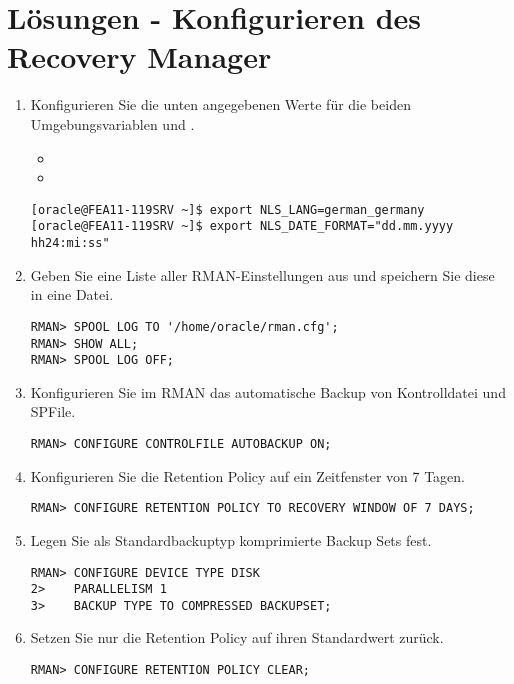 \section{L\"osungen - Konfigurieren des Recovery Manager}
  \begin{enumerate}
    \item Konfigurieren Sie die unten angegebenen Werte f\"ur die beiden Umgebungsvariablen  und .
      \begin{itemize}
        \item {}
        \item {}
      \end{itemize}
      \begin{lstlisting}[language=terminal]
[oracle@FEA11-119SRV ~]$ export NLS_LANG=german_germany
[oracle@FEA11-119SRV ~]$ export NLS_DATE_FORMAT="dd.mm.yyyy hh24:mi:ss"
      \end{lstlisting}
    \item Geben Sie eine Liste aller RMAN-Einstellungen aus und speichern Sie diese in eine Datei.
      \begin{lstlisting}[language=rman]
RMAN> SPOOL LOG TO '/home/oracle/rman.cfg';
RMAN> SHOW ALL;
RMAN> SPOOL LOG OFF;
      \end{lstlisting}
    \item Konfigurieren Sie im RMAN das automatische Backup von Kontrolldatei und SPFile.
      \begin{lstlisting}[language=rman]
RMAN> CONFIGURE CONTROLFILE AUTOBACKUP ON;
      \end{lstlisting}
    \item Konfigurieren Sie die Retention Policy auf ein Zeitfenster von 7 Tagen.
      \begin{lstlisting}[language=rman]
RMAN> CONFIGURE RETENTION POLICY TO RECOVERY WINDOW OF 7 DAYS;
      \end{lstlisting}
    \item Legen Sie als Standardbackuptyp komprimierte Backup Sets fest.
      \begin{lstlisting}[language=rman]
RMAN> CONFIGURE DEVICE TYPE DISK
2>    PARALLELISM 1
3>    BACKUP TYPE TO COMPRESSED BACKUPSET;
      \end{lstlisting}
    \item Setzen Sie nur die Retention Policy auf ihren Standardwert zur\"uck.
      \begin{lstlisting}[language=rman]
RMAN> CONFIGURE RETENTION POLICY CLEAR;
      \end{lstlisting}
  \end{enumerate}
